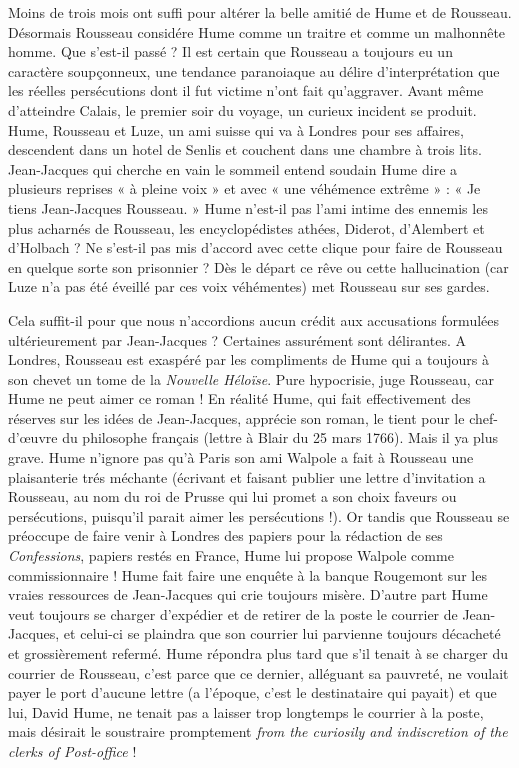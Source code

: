 Moins de trois mois ont suffi pour altérer la belle
amitié de Hume et de Rousseau. Désormais Rousseau
considére Hume comme un traitre et comme un
malhonnête homme. Que s’est-il passé ? Il est certain
que Rousseau a toujours eu un caractère soupçonneux,
une tendance paranoiaque au délire d’interprétation
que les réelles persécutions dont il fut
victime n’ont fait qu’aggraver. Avant même d’atteindre Calais,
le premier soir du voyage, un curieux
incident se produit. Hume, Rousseau et Luze, un
ami suisse qui va à Londres pour ses affaires, descendent
dans un hotel de Senlis et couchent dans une
chambre à trois lits. Jean-Jacques qui cherche en
vain le sommeil entend soudain Hume dire a plusieurs
reprises « à pleine voix » et avec « une véhémence extrême » :
« Je tiens Jean-Jacques Rousseau. »
Hume n’est-il pas l’ami intime des ennemis les plus
acharnés de Rousseau, les encyclopédistes athées,
Diderot, d’Alembert et d’Holbach ? Ne s’est-il
pas mis d’accord avec cette clique pour faire de
Rousseau en quelque sorte son prisonnier ? Dès le
départ ce rêve ou cette hallucination (car Luze
n’a pas été éveillé par ces voix véhémentes) met
Rousseau sur ses gardes.

Cela suffit-il pour que nous n’accordions aucun
crédit aux accusations formulées ultérieurement par
Jean-Jacques ? Certaines assurément sont délirantes.
A Londres, Rousseau est exaspéré par les
compliments de Hume qui a toujours à son chevet
un tome de la {\it Nouvelle Héloïse}. Pure hypocrisie,
juge Rousseau, car Hume ne peut aimer ce roman !
En réalité Hume, qui fait effectivement des réserves
sur les idées de Jean-Jacques, apprécie son roman,
le tient pour le chef-d’{\oe}uvre du philosophe français
(lettre à Blair du 25 mars 1766). Mais il ya plus
grave. Hume n’ignore pas qu’à Paris son ami Walpole
a fait à Rousseau une plaisanterie trés méchante
(écrivant et faisant publier une lettre d’invitation a
Rousseau, au nom du roi de Prusse qui lui promet a
son choix faveurs ou persécutions, puisqu’il parait
aimer les persécutions !). Or tandis que Rousseau se
préoccupe de faire venir à Londres des papiers pour
la rédaction de ses {\it Confessions}, papiers restés en
France, Hume lui propose Walpole comme commissionnaire !
Hume fait faire une enquête à la banque
Rougemont sur les vraies ressources de Jean-Jacques
qui crie toujours misère. D’autre part Hume veut
toujours se charger d’expédier et de retirer de la
poste le courrier de Jean-Jacques, et celui-ci se
plaindra que son courrier lui parvienne toujours
décacheté et grossièrement refermé. Hume répondra
plus tard que s’il tenait à se charger du courrier de
Rousseau, c’est parce que ce dernier, alléguant sa
pauvreté, ne voulait payer le port d’aucune lettre
(a l’époque, c’est le destinataire qui payait) et que
lui, David Hume, ne tenait pas a laisser trop longtemps
le courrier à la poste, mais désirait le soustraire
promptement {\it from the curiosily and indiscretion
of the clerks of Post-office} !

